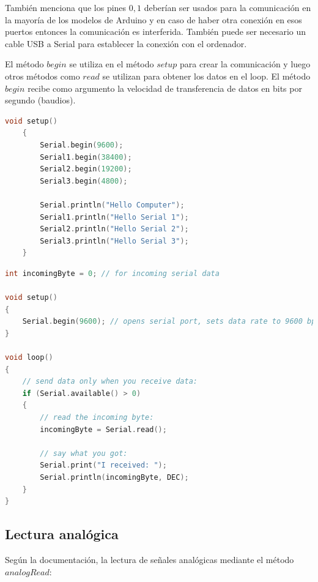 \documentclass{article}
\begin{document}
    También menciona que los pines $0,1$ deberían ser usados para la
    comunicación en la mayoría de los modelos de Arduino y en caso de haber
    otra conexión en esos puertos entonces la comunicación es interferida.
    También puede ser necesario un cable USB a Serial para establecer la
    conexión con el ordenador.

    \bigbreak

    El método $begin$ se utiliza en el método $setup$ para crear la
    comunicación y luego otros métodos como $read$ se utilizan para obtener
    los datos en el loop. El método $begin$ recibe como argumento la
    velocidad de transferencia de datos en bits por segundo (baudios).

    \bigbreak

    \begin{lstlisting}[language=C, caption=Uso de Serial en Arduino Mega con
    todos sus puertos Seriales. \footnotesize Fuente: Serial - Arduino
    Reference (begin) \cite{arduino-serial}]
    void setup()
    {
        Serial.begin(9600);
        Serial1.begin(38400);
        Serial2.begin(19200);
        Serial3.begin(4800);

        Serial.println("Hello Computer");
        Serial1.println("Hello Serial 1");
        Serial2.println("Hello Serial 2");
        Serial3.println("Hello Serial 3");
    }
\end{lstlisting}


\begin{lstlisting}[language=C, caption=Uso del método read. \footnotesize
Fuente: Serial - Arduino Reference (read) \cite{arduino-serial}]
int incomingByte = 0; // for incoming serial data

void setup()
{
    Serial.begin(9600); // opens serial port, sets data rate to 9600 bps
}

void loop()
{
    // send data only when you receive data:
    if (Serial.available() > 0)
    {
        // read the incoming byte:
        incomingByte = Serial.read();

        // say what you got:
        Serial.print("I received: ");
        Serial.println(incomingByte, DEC);
    }
}
\end{lstlisting}

\subsection{Lectura analógica}

Según la documentación, la lectura de señales analógicas mediante el método
$analogRead$:
\end{document}
